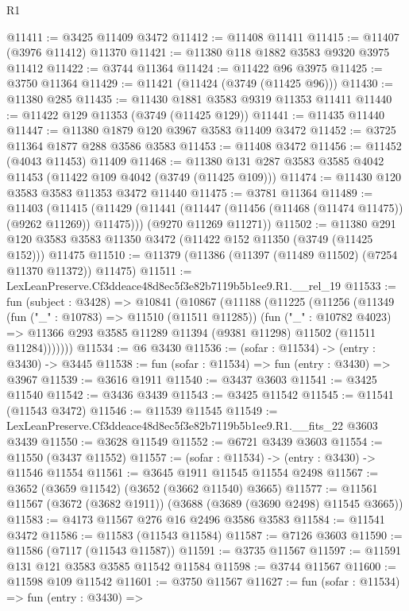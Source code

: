 \begin{lexlean}{R1}
\begin{coremodule}
@11411 := @3425 @11409 @3472
@11412 := @11408 @11411
@11415 := @11407 (@3976 @11412) @11370
@11421 := @11380 @118 @1882 @3583 @9320 @3975 @11412
@11422 := @3744 @11364
@11424 := @11422 @96 @3975
@11425 := @3750 @11364
@11429 := @11421 (@11424 (@3749 (@11425 @96)))
@11430 := @11380 @285
@11435 := @11430 @1881 @3583 @9319 @11353 @11411
@11440 := @11422 @129 @11353 (@3749 (@11425 @129))
@11441 := @11435 @11440
@11447 := @11380 @1879 @120 @3967 @3583 @11409 @3472
@11452 := @3725 @11364 @1877 @288 @3586 @3583
@11453 := @11408 @3472
@11456 := @11452 (@4043 @11453) @11409
@11468 := @11380 @131 @287 @3583 @3585 @4042 @11453 (@11422 @109 @4042 (@3749 (@11425 @109)))
@11474 := @11430 @120 @3583 @3583 @11353 @3472 @11440
@11475 := @3781 @11364
@11489 := @11403
    (@11415
      (@11429 (@11441 (@11447 (@11456 (@11468 (@11474 @11475)) (@9262 @11269)) @11475)))
      (@9270 @11269 @11271))
@11502 := @11380
    @291
    @120
    @3583
    @3583
    @11350
    @3472
    (@11422 @152 @11350 (@3749 (@11425 @152)))
    @11475
@11510 := @11379 (@11386 (@11397 (@11489 @11502) (@7254 @11370 @11372)) @11475)
@11511 := LexLeanPreserve.Cf3ddeace48d8ec5f3e82b7119b5b1ee9.R1.__rel_19
@11533 := fun (subject : @3428) =>
  @10841
    (@10867
      (@11188
        (@11225
          (@11256
            (@11349
              (fun ("_" : @10783) => @11510 (@11511 @11285))
              (fun ("_" : @10782 @4023) =>
              @11366 @293 @3585 @11289 @11394 (@9381 @11298) @11502 (@11511 @11284)))))))
@11534 := @6 @3430
@11536 := (sofar : @11534) -> (entry : @3430) -> @3445
@11538 := fun (sofar : @11534) => fun (entry : @3430) => @3967
@11539 := @3616 @1911
@11540 := @3437 @3603
@11541 := @3425 @11540
@11542 := @3436 @3439
@11543 := @3425 @11542
@11545 := @11541 (@11543 @3472)
@11546 := @11539 @11545
@11549 := LexLeanPreserve.Cf3ddeace48d8ec5f3e82b7119b5b1ee9.R1.__fits_22 @3603 @3439
@11550 := @3628 @11549
@11552 := @6721 @3439 @3603
@11554 := @11550 (@3437 @11552)
@11557 := (sofar : @11534) -> (entry : @3430) -> @11546 @11554
@11561 := @3645 @1911 @11545 @11554 @2498
@11567 := @3652 (@3659 @11542) (@3652 (@3662 @11540) @3665)
@11577 := @11561 @11567 (@3672 (@3682 @1911)) (@3688 (@3689 (@3690 @2498) @11545 @3665))
@11583 := @4173 @11567 @276 @16 @2496 @3586 @3583
@11584 := @11541 @3472
@11586 := @11583 (@11543 @11584)
@11587 := @7126 @3603
@11590 := @11586 (@7117 (@11543 @11587))
@11591 := @3735 @11567
@11597 := @11591 @131 @121 @3583 @3585 @11542 @11584
@11598 := @3744 @11567
@11600 := @11598 @109 @11542
@11601 := @3750 @11567
@11627 := fun (sofar : @11534) =>
  fun (entry : @3430) =>

\end{coremodule}
\end{lexlean}
